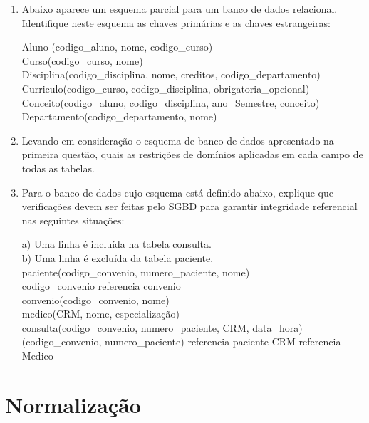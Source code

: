 \documentclass[11pt]{article}
\begin{document}
\begin{enumerate}
	\item Abaixo aparece um esquema parcial para um banco de dados relacional. Identifique neste
	esquema as chaves primárias e as chaves estrangeiras: 
	
	Aluno (codigo\_aluno, nome, codigo\_curso)\\
	Curso(codigo\_curso, nome)\\
	Disciplina(codigo\_disciplina, nome, creditos, codigo\_departamento)\\
	Curriculo(codigo\_curso, codigo\_disciplina, obrigatoria\_opcional)\\
	Conceito(codigo\_aluno, codigo\_disciplina, ano\_Semestre, conceito)\\
	Departamento(codigo\_departamento, nome)
	
	\item Levando em consideração o esquema de banco de dados apresentado na primeira questão, quais
	as restrições de domínios aplicadas em cada campo de todas as tabelas.
	
	\item Para o banco de dados cujo esquema está definido abaixo, explique que verificações devem ser
	feitas pelo SGBD para garantir integridade referencial nas seguintes situações: 
	
	a) Uma linha é incluída na tabela consulta.\\
	b) Uma linha é excluída da tabela paciente.\\
	
	paciente(codigo\_convenio, numero\_paciente, nome)\\
	codigo\_convenio referencia convenio\\
	convenio(codigo\_convenio, nome)\\
	medico(CRM, nome, especialização)\\
	consulta(codigo\_convenio, numero\_paciente, CRM, data\_hora)\\
	(codigo\_convenio, numero\_paciente) referencia paciente CRM referencia Medico 
\end{enumerate}

\newpage

\section{Normalização}
\end{document}

